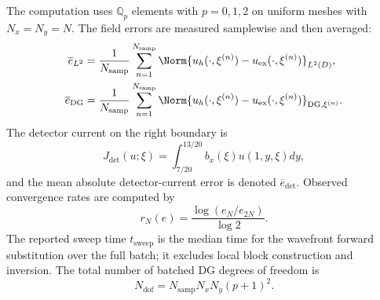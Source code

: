 \documentclass[final]{amsart}
\begin{document}
The computation uses $\mathbb{Q}_p$ elements with $p=0,1,2$ on uniform meshes
with $N_x=N_y=N$. The field errors are measured samplewise and then
averaged:
\begin{align}
\overline{e}_{L^2}
&=
\frac{1}{N_{\mathrm{samp}}}
\sum_{n=1}^{N_{\mathrm{samp}}}
\Norm{
u_h(\cdot,\xi^{(n)})
-
u_{\mathrm{ex}}(\cdot,\xi^{(n)})
}_{L^2(D)},
\label{eq:ex1_mean_l2_error}
\\
\overline{e}_{\mathrm{DG}}
&=
\frac{1}{N_{\mathrm{samp}}}
\sum_{n=1}^{N_{\mathrm{samp}}}
\Norm{
u_h(\cdot,\xi^{(n)})
-
u_{\mathrm{ex}}(\cdot,\xi^{(n)})
}_{\mathrm{DG},\xi^{(n)}}.
\label{eq:ex1_mean_dg_error}
\end{align}
The detector current on the right boundary is
\begin{equation}
J_{\mathrm{det}}(u;\xi)
=
\int_{7/20}^{13/20}
b_x(\xi)u(1,y,\xi)dy,
\label{eq:ex1_detector}
\end{equation}
and the mean absolute detector-current error is denoted
$\overline{e}_{\mathrm{det}}$. Observed convergence rates are computed
by
\begin{equation}
r_N(e)
=
\frac{\log(e_N/e_{2N})}{\log 2}.
\label{eq:observed_rate}
\end{equation}
The reported sweep time $t_{\mathrm{sweep}}$ is the median time for
the wavefront forward substitution over the full batch; it excludes
local block construction and inversion. The total number of batched DG
degrees of freedom is
\begin{equation}
  N_{\mathrm{dof}}
  =
  N_{\mathrm{samp}}N_xN_y(p+1)^2.
  \label{eq:ex1_total_dofs}
\end{equation}
\end{document}
